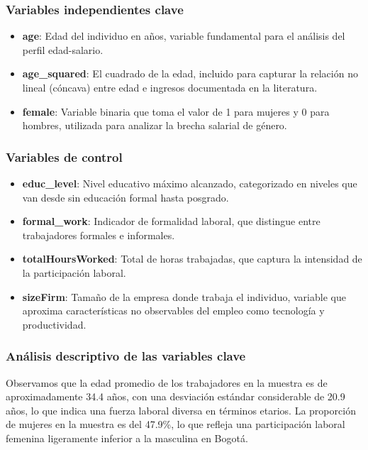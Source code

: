 \documentclass[12pt,a4paper,onecolumn]{article}
\begin{document}
\subsubsection{Variables independientes clave}

\begin{itemize}
    \item \textbf{age}: Edad del individuo en años, variable fundamental para el análisis del perfil edad-salario.
    
    \item \textbf{age\_squared}: El cuadrado de la edad, incluido para capturar la relación no lineal (cóncava) entre edad e ingresos documentada en la literatura.
    
    \item \textbf{female}: Variable binaria que toma el valor de 1 para mujeres y 0 para hombres, utilizada para analizar la brecha salarial de género.
\end{itemize}

\subsubsection{Variables de control}

\begin{itemize}
    \item \textbf{educ\_level}: Nivel educativo máximo alcanzado, categorizado en niveles que van desde sin educación formal hasta posgrado.
    
    \item \textbf{formal\_work}: Indicador de formalidad laboral, que distingue entre trabajadores formales e informales.
    
    \item \textbf{totalHoursWorked}: Total de horas trabajadas, que captura la intensidad de la participación laboral.
    
    \item \textbf{sizeFirm}: Tamaño de la empresa donde trabaja el individuo, variable que aproxima características no observables del empleo como tecnología y productividad.
\end{itemize}

\subsubsection{Análisis descriptivo de las variables clave}

Observamos que la edad promedio de los trabajadores en la muestra es de aproximadamente 34.4 años, con una desviación estándar considerable de 20.9 años, lo que indica una fuerza laboral diversa en términos etarios. La proporción de mujeres en la muestra es del 47.9\%, lo que refleja una participación laboral femenina ligeramente inferior a la masculina en Bogotá.
\end{document}

